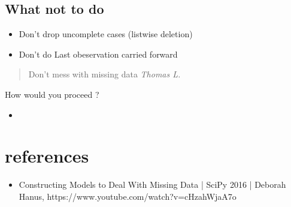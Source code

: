 \documentclass{beamer}
\begin{document}
\subsection{What not to do}
\begin{frame}
	\begin{itemize}
	    \item<1->Don't drop uncomplete cases (listwise deletion)
	    \item<2->Don't do Last obeservation carried forward
        \end{itemize}
        \begin{quote}
		Don't mess with missing data \it{Thomas L.}
	\end{quote}
\end{frame}

\begin{frame}
\Huge How would you proceed ?	
\end{frame}

\begin{frame}
	\begin{itemize}
	\item<1->
	\end{itemize}
\end{frame}

\section{references}
\begin{frame}
	\begin{itemize}
		\item<1->Constructing Models to Deal With Missing Data | SciPy 2016 | Deborah Hanus, https://www.youtube.com/watch?v=cHzahWjaA7o
	\end{itemize}
\end{frame}
\end{document}
